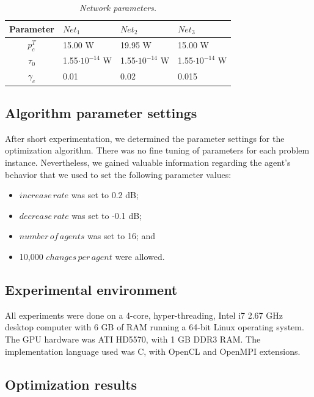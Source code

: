 \begin{table}
\caption{\textit{Network parameters.\label{tab:network-parameters}}}


\centering

\begin{tabular}{clll}
\hline 
Parameter & $Net_{1}$ & $Net_{2}$ & $Net_{3}$\tabularnewline
\hline 
$p_{c}^{T}$ & 15.00 W & 19.95 W & 15.00 W\tabularnewline
$\tau_{0}$ & 1.55$\cdot10^{-14}$ W & 1.55$\cdot10^{-14}$ W & 1.55$\cdot10^{-14}$ W\tabularnewline
$\gamma_{c}$ & 0.01 & 0.02 & 0.015\tabularnewline
\hline 
\end{tabular}
\end{table}



\subsection{Algorithm parameter settings \label{sub:Algorithm-parameter-settings}}

After short experimentation, we determined the parameter settings
for the optimization algorithm. There was no fine tuning of parameters
for each problem instance. Nevertheless, we gained valuable information
regarding the agent's behavior that we used to set the following parameter
values:
\begin{itemize}
\item $increase\, rate$ was set to 0.2 dB;
\item $decrease\, rate$ was set to -0.1 dB;
\item $number\, of\, agents$ was set to 16; and
\item 10,000 $changes\, per\, agent$ were allowed.
\end{itemize}

\subsection{Experimental environment}

All experiments were done on a 4-core, hyper-threading, Intel i7 2.67
GHz desktop computer with 6 GB of RAM running a 64-bit Linux operating
system. The GPU hardware was ATI HD5570, with 1 GB DDR3 RAM. The implementation
language used was C, with OpenCL and OpenMPI extensions.


\subsection{Optimization results}


